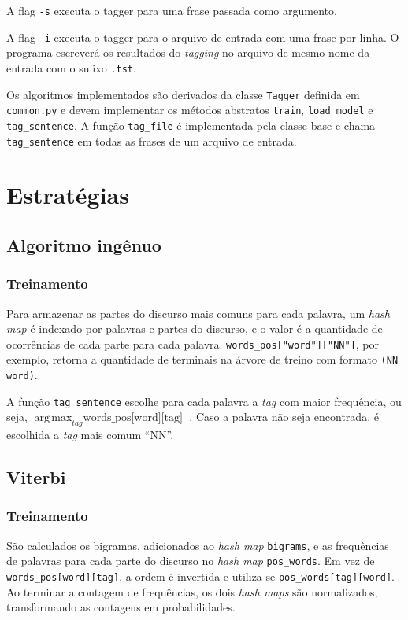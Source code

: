 \documentclass[12pt, a4paper]{article}
\newcommand{\code}[1]{{\lstinline{#1}}}
\DeclareMathOperator*{\argmax}{arg\,max}
\begin{document}
A flag \code{-s} executa o tagger para uma frase passada como argumento.

A flag \code{-i} executa o tagger para o arquivo de entrada com uma frase por
linha. O programa escreverá os resultados do \emph{tagging} no arquivo de mesmo
nome da entrada com o sufixo \code{.tst}.

Os algoritmos implementados são derivados da classe \code{Tagger} definida em
\code{common.py} e devem implementar os métodos abstratos \code{train},
\code{load_model} e \code{tag_sentence}. A função \code{tag_file} é implementada
pela classe base e chama \code{tag_sentence} em todas as frases de
um arquivo de entrada.

\section{Estratégias}
\subsection{Algoritmo ingênuo}
\subsubsection{Treinamento}
Para armazenar as partes do discurso mais comuns para cada palavra, um
\emph{hash map} é indexado por palavras e partes do discurso, e o valor é a
quantidade de ocorrências de cada parte para cada palavra.
\code{words_pos["word"]["NN"]}, por exemplo, retorna a quantidade de terminais
na árvore de treino com formato \code{(NN word)}.

A função \code{tag_sentence} escolhe para cada palavra a \emph{tag}
com maior frequência, ou seja, $ \argmax_{tag} \text{words\_pos[word][tag]} $ .
Caso a palavra não seja encontrada, é escolhida a \emph{tag} mais comum ``NN''.

\subsection{Viterbi}
\subsubsection{Treinamento}
São calculados os bigramas, adicionados ao \emph{hash map} \code{bigrams}, e as
frequências de palavras para cada parte do discurso no \emph{hash map}
\code{pos_words}. Em vez de \code{words_pos[word][tag]}, a ordem é invertida e
utiliza-se \code{pos_words[tag][word]}. Ao terminar a contagem de frequências,
os dois \emph{hash maps} são normalizados, transformando as contagens em
probabilidades.
\end{document}
